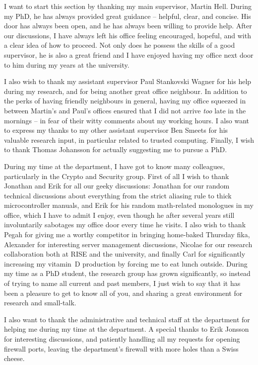 
I want to start this section by thanking my main supervisor, Martin Hell.
During my PhD, he has always provided great guidance -- helpful, clear, and concise.
His door has always been open, and he has always been willing to provide help.
After our discussions, I have always left his office feeling encouraged, hopeful, and with a clear idea of how to proceed.
Not only does he possess the skills of a good supervisor, he is also a great friend and I have enjoyed having my office next door to him during my years at the university.

I also wish to thank my assistant supervisor Paul Stankovski Wagner for his help during my research, and for being another great office neighbour.
In addition to the perks of having friendly neighbours in general, having my office squeezed in between Martin's and Paul's offices ensured that I did not arrive \emph{too} late in the mornings -- in fear of their witty comments about my working hours.
I also want to express my thanks to my other assistant supervisor Ben Smeets for his valuable research input, in particular related to trusted computing.
Finally, I wish to thank Thomas Johansson for actually suggesting me to pursue a PhD.

During my time at the department, I have got to know many colleagues, particularly in the Crypto and Security group.
First of all I wish to thank Jonathan and Erik for all our geeky discussions:
Jonathan for our random technical discussions about everything from the strict aliasing rule to thick microcontroller manuals,
and Erik for his random math-related monologues in my office, which I have to admit I enjoy, even though he after several years still involuntarily sabotages my office door every time he visits.
I also wish to thank Pegah for giving me a worthy competitor in bringing home-baked Thursday fika, Alexander for interesting server management discussions, Nicolae for our research collaboration both at RISE and the university, and finally Carl for significantly increasing my vitamin~D production by forcing me to eat lunch outside.
During my time as a PhD student, the research group has grown significantly, so instead of trying to name all current and past members, I just wish to say that it has been a pleasure to get to know all of you, and sharing a great environment for research and small-talk.

I also want to thank the administrative and technical staff at the department for helping me during my time at the department.
A special thanks to Erik Jonsson for interesting discussions, and patiently handling all my requests for opening firewall ports, leaving the department's firewall with more holes than a Swiss cheese.


